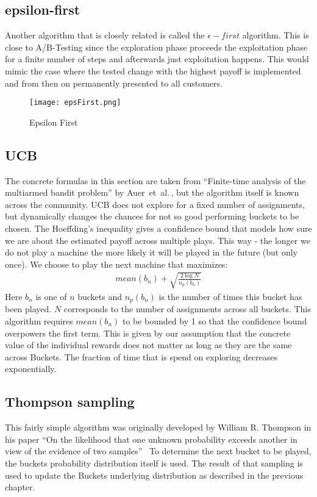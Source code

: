 \documentclass[main.tex]{subfiles}
\begin{document}
\subsection{epsilon-first}
Another algorithm that is closely related is called the $\epsilon-first$ algorithm. This is close to A/B-Testing since the exploration phase proceeds the exploitation phase for a finite number of steps and afterwards just exploitation happens. This would mimic the case where the tested change with the highest payoff is implemented and from then on permanently presented to all customers.
\begin{figure}[ht]
\texttt{[image: epsFirst.png]}
\centering
\caption{Epsilon First}
\label{fig:EpsiFir}
\end{figure}

\subsection{UCB}
The concrete formulas in this section are taken from ``Finite-time analysis of the multiarmed bandit problem'' by Auer~et~al.\,\cite{auer2002finite}, but the algorithm itself is known across the community. UCB does not explore for a fixed number of assignments, but dynamically changes the chances for not so good performing buckets to be chosen. The Hoeffding's inequality gives a confidence bound that models how sure we are about the estimated payoff across multiple plays. This way - the longer we do not play a machine the more likely it will be played in the future (but only once). We choose to play the next machine that maximizes:
\begin{align*}
mean(b_n) + \sqrt{\frac{2\log{N}}{n_p(b_n)}}
\end{align*}
Here $b_n$ is one of $n$ buckets and $n_p(b_n)$ is the number of times this bucket has been played. $N$ corresponds to the number of assignments across all buckets. This algorithm requires $mean(b_n)$ to be bounded by 1 so that the confidence bound overpowers the first term. This is given by our assumption that the concrete value of the individual rewards does not matter as long as they are the same across Buckets. The fraction of time that is spend on exploring decreases exponentially.


\subsection{Thompson sampling}
This fairly simple algorithm was originally developed by William R. Thompson in his paper ``On the likelihood that one unknown probability exceeds another in view of the evidence of two samples''~\cite{thompson1933likelihood} To determine the next bucket to be played, the buckets probability distribution itself is used. The result of that sampling is used to update the Buckets underlying distribution as described in the previous chapter.
\end{document}

